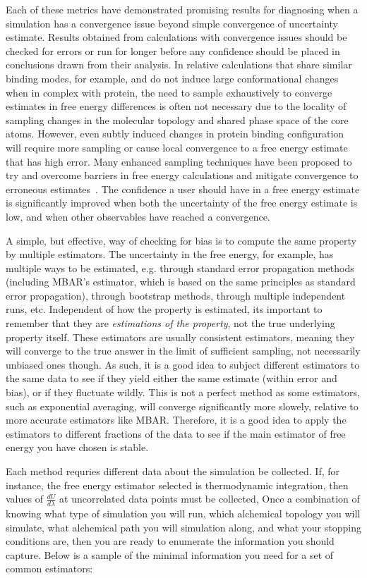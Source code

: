 \documentclass[9pt,bestpractices]{livecoms}
\begin{document}
Each of these metrics have demonstrated promising results for diagnosing when a simulation has a convergence issue beyond simple convergence of uncertainty estimate. 
Results obtained from calculations with convergence issues should be checked for errors or run for longer before any confidence should be placed in conclusions drawn from their analysis.
In relative calculations that share similar binding modes, for example, and do not induce large conformational changes when in complex with protein, the need to sample exhaustively to converge estimates in free energy differences is often not necessary due to the locality of sampling changes in the molecular topology and shared phase space of the core atoms.
However, even subtly induced changes in protein binding configuration will require more sampling or cause local convergence to a free energy estimate that has high error.
Many enhanced sampling techniques have been proposed to try and overcome barriers in free energy calculations and mitigate convergence to erroneous estimates~\cite{}. 
The confidence a user should have in a free energy estimate is significantly improved when both the uncertainty of the free energy estimate is low, and when other observables have reached a convergence.

A simple, but effective, way of checking for bias is to compute the same property by multiple estimators. 
The uncertainty in the free energy, for example, has multiple ways to be estimated, e.g. through standard error propagation methods (including MBAR's estimator, which is based on the same principles as standard error propagation), through bootstrap methods, through multiple independent runs, etc. 
Independent of how the property is estimated, its important to remember that they are \textit{estimations of the property}, not the true underlying property itself. 
These estimators are usually consistent estimators, meaning they will converge to the true answer in the limit of sufficient sampling, not necessarily unbiased ones though.
As such, it is a good idea to subject different estimators to the same data to see if they yield either the same estimate (within error and bias), or if they fluctuate wildly. 
This is not a perfect method as some estimators, such as exponential averaging, will converge significantly more slowely, relative to more accurate estimators like MBAR. 
Therefore, it is a good idea to apply the estimators to different fractions of the data to see if the main estimator of free energy you have chosen is stable.


Each method requries different data about the simulation be collected.  If, for instance, the free energy estimator selected is thermodynamic integration, then values of $\frac{dU}{d\lambda}$ at uncorrelated data points must be collected,  Once a combination of knowing what type of simulation you will run, which alchemical topology you will simulate, what alchemical path you will simulation along, and what your stopping conditions are, then you are ready to enumerate the information you should capture. Below is a sample of the minimal information you need for a set of common estimators:
\end{document}
